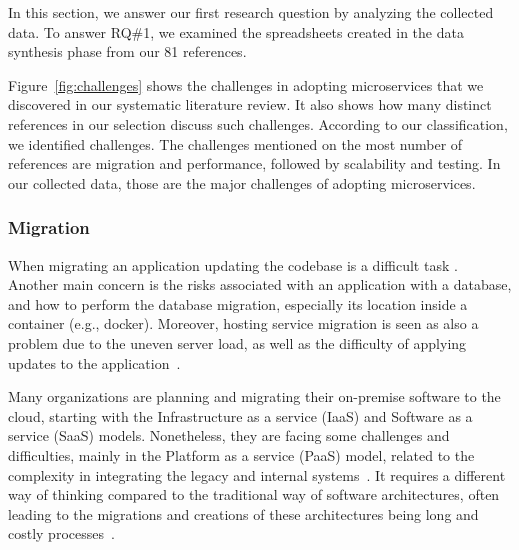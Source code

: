 In this section, we answer our first research question by analyzing the collected data.
To answer RQ\#1, we examined the spreadsheets created in the data synthesis phase from our 81 references.

Figure~\ref{fig:challenges} shows the challenges in adopting microservices that we discovered in our systematic literature review. It also shows how many distinct references in our selection discuss such challenges. 
According to our classification, we identified \challengecount challenges.
The challenges mentioned on the most number of references are migration and performance, followed by scalability and testing. In our collected data, those are the major challenges of adopting microservices.


\subsubsection{Migration}%
When migrating an application updating the codebase is a difficult task \cite{Tuuli2020, wang2020}.
Another main concern is the risks associated with an application with a database, and how to perform the database migration, especially its location inside a container (e.g., docker)\cite{Tuuli2020}.
Moreover, hosting service migration is seen as also a problem due to the uneven server load, as well as the difficulty of applying updates to the application~\cite{Tuuli2020}.

Many organizations are planning and migrating their on-premise software to the cloud, starting with the Infrastructure as a service (IaaS) and Software as a service (SaaS) models. Nonetheless, they are facing some challenges and difficulties, mainly in the Platform as a service (PaaS) model, related to the complexity in integrating the legacy and internal systems~\cite{rosa2018}. It requires a different way of thinking compared to the traditional way of software architectures, often leading to the migrations and creations of these architectures being long and costly processes~\cite{Leo2019}.


